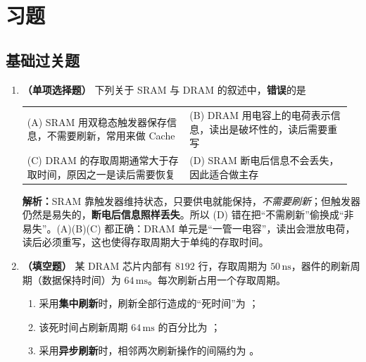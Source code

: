 \section{习题}

\subsection{基础过关题}

\begin{enumerate}[leftmargin=*]

\item \textbf{（单项选择题）} 下列关于 SRAM 与 DRAM 的叙述中，\textbf{错误}的是

\begin{center}\small
\begin{tabular}{@{}p{0.48\linewidth}p{0.48\linewidth}@{}}
(A) SRAM 用双稳态触发器保存信息，不需要刷新，常用来做 Cache & (B) DRAM 用电容上的电荷表示信息，读出是破坏性的，读后需要重写 \\[4pt]
(C) DRAM 的存取周期通常大于存取时间，原因之一是读后需要恢复 & (D) SRAM 断电后信息不会丢失，因此适合做主存
\end{tabular}
\end{center}

\ifshowsolutions\par\noindent\textbf{解析：}SRAM 靠触发器维持状态，只要供电就能保持，\emph{不需要刷新}；但触发器仍然是易失的，\textbf{断电后信息照样丢失}。所以 (D) 错在把“不需刷新”偷换成“非易失”。(A)(B)(C) 都正确：DRAM 单元是“一管一电容”，读出会泄放电荷，读后必须重写，这也使得存取周期大于单纯的存取时间。\else \answerarea \fi

\item \textbf{（填空题）} 某 DRAM 芯片内部有 $8192$ 行，存取周期为 $50\,\mathrm{ns}$，器件的刷新周期（数据保持时间）为 $64\,\mathrm{ms}$。每次刷新占用一个存取周期。
\begin{enumerate}
    \item[(1)] 采用\textbf{集中刷新}时，刷新全部行造成的“死时间”为 \underline{\hspace{1.4cm}}；
    \item[(2)] 该死时间占刷新周期 $64\,\mathrm{ms}$ 的百分比为 \underline{\hspace{1.4cm}}；
    \item[(3)] 采用\textbf{异步刷新}时，相邻两次刷新操作的间隔约为 \underline{\hspace{1.4cm}}。
\end{enumerate}


\end{enumerate}
